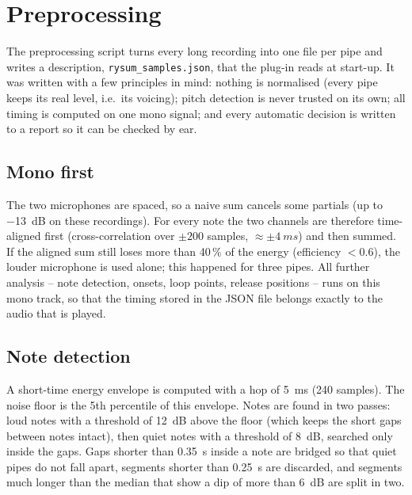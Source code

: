 \documentclass[11pt,a4paper,parskip=half,DIV=11,toc=bibliography]{scrartcl}
\newcommand{\fn}[1]{\mbox{\texttt{#1}}}
\begin{document}
\section{Preprocessing}
\label{sec:preprocessing}

The preprocessing script turns every long recording into one file per pipe and writes a
description, \fn{rysum\_samples.json}, that the plug-in reads at start-up. It was written with a few
principles in mind: nothing is normalised (every pipe keeps its real level, i.e.\ its voicing);
pitch detection is never trusted on its own; all timing is computed on one mono signal; and every
automatic decision is written to a report so it can be checked by ear.

\subsection{Mono first}
The two microphones are spaced, so a naive sum cancels some partials (up to \SI{-13}{dB} on these
recordings). For every note the two channels are therefore time-aligned first (cross-correlation over
$\pm200$ samples, $\approx\pm\SI{4}{ms}$) and then summed. If the aligned sum still loses more than
40\,\% of the energy (efficiency $<0.6$), the louder microphone is used alone; this happened for three
pipes. All further analysis -- note detection, onsets, loop points, release positions -- runs on this
mono track, so that the timing stored in the JSON file belongs exactly to the audio that is played.

\subsection{Note detection}
A short-time energy envelope is computed with a hop of \SI{5}{ms} (240 samples). The noise floor is the
5th percentile of this envelope. Notes are found in two passes: loud notes with a threshold of
\SI{12}{dB} above the floor (which keeps the short gaps between notes intact), then quiet notes with a
threshold of \SI{8}{dB}, searched only inside the gaps. Gaps shorter than \SI{0.35}{s} inside a note are
bridged so that quiet pipes do not fall apart, segments shorter than \SI{0.25}{s} are discarded, and
segments much longer than the median that show a dip of more than \SI{6}{dB} are split in two.
\end{document}
